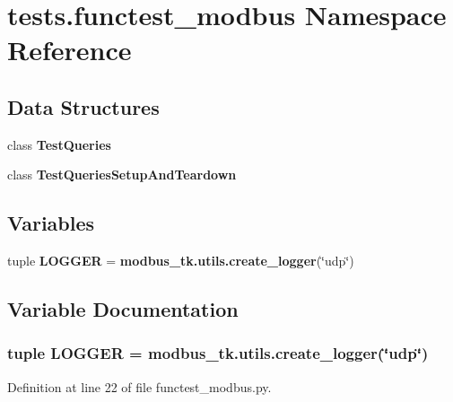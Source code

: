 \section{tests.\+functest\+\_\+modbus Namespace Reference}
\label{namespacetests_1_1functest__modbus}
\subsection*{Data Structures}
\begin{DoxyCompactItemize}
\item 
class {\bf Test\+Queries}
\item 
class {\bf Test\+Queries\+Setup\+And\+Teardown}
\end{DoxyCompactItemize}
\subsection*{Variables}
\begin{DoxyCompactItemize}
\item 
tuple {\bf L\+O\+G\+G\+E\+R} = {\bf modbus\+\_\+tk.\+utils.\+create\+\_\+logger}(\char`\"{}udp\char`\"{})
\end{DoxyCompactItemize}


\subsection{Variable Documentation}
\subsubsection[{L\+O\+G\+G\+E\+R}]{\setlength{\rightskip}{0pt plus 5cm}tuple L\+O\+G\+G\+E\+R = {\bf modbus\+\_\+tk.\+utils.\+create\+\_\+logger}(\char`\"{}udp\char`\"{})}\label{namespacetests_1_1functest__modbus_ae9c29667350ae00a0837fc1e77c279e2}


Definition at line 22 of file functest\+\_\+modbus.\+py.

